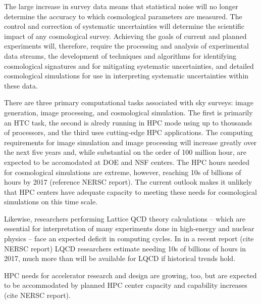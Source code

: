 The large increase in survey data means that statistical noise will no longer determine the accuracy to which cosmological parameters are 
measured. The control and correction of systematic uncertainties will determine the scientific impact of any cosmological survey. 
Achieving the goals of current and planned experiments will, therefore, require the processing and analysis of experimental data streams, 
the development of techniques and algorithms for identifying cosmological signatures and for mitigating systematic uncertainties, 
 and detailed cosmological simulations for use in interpreting systematic uncertainties within these data. 

There are three primary computational tasks associated with sky surveys: image generation, image processing, and cosmological simulation. The first 
is primarily an HTC task, the second is alredy running in HPC mode using up to thousands of processors, and the third uses cutting-edge HPC applications.  The computing requirements for image simulation and image processing will increase greatly over the next five years and, while substantial
on the order of 100 million hour, are expected to be accomodated at DOE and NSF centers. The HPC hours needed for cosmological simulations are extreme, however, reaching 10s of billions of hours by 2017 (reference NERSC report). The current outlook
makes it unlikely that HPC centers have adequate capacity to meeting these needs for cosmological
simulations on this time scale. 
 
Likewise, researchers performing Lattice QCD theory calculations 
-- which are essential for interpretation of many experiments done in high-energy and nuclear physics -- 
face an expected deficit in computing cycles. In in a recent report (cite NERSC report) 
LQCD researchers estimate needing 10s of billions of  hours in 2017, much more than will be available 
for LQCD if historical trends hold.

HPC needs for accelerator research and design are growing, too, but are expected to be accommodated by planned HPC center capacity and capability increases (cite NERSC report). 


